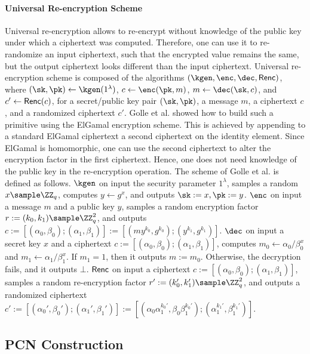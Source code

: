 \paragraph{Universal Re-encryption Scheme} Universal re-encryption allows to re-encrypt without 
knowledge of the public key under which a ciphertext was computed. Therefore, one can use it to 
re-randomize an input ciphertext, such that the encrypted value remains the same, but the output 
ciphertext looks different than the input ciphertext. Universal re-encryption scheme is composed 
of the algorithms $(\kgen, \enc, \dec, \renc)$, where $(\sk, \pk) \gets \kgen(1^\lambda)$, 
$c \gets \enc(\pk, m)$, $m \gets \dec(\sk, c)$, and $c' \gets \mathsf{Renc}(c)$, for a secret/public key 
pair $(\sk, \pk)$, a message $m$, a ciphertext $c$, and a randomized ciphertext $c'$. 
Golle et al. \cite{gjjs} showed how to build such a primitive using the ElGamal encryption 
scheme. This is achieved by appending to a standard ElGamal ciphertext a second ciphertext on 
the identity element. Since ElGamal is homomorphic, one can use the second ciphertext to alter 
the encryption factor in the first ciphertext. Hence, one does not need knowledge of the public 
key in the re-encryption operation. The scheme of Golle et al. is defined as follows. $\kgen$ on 
input the security parameter $1^\lambda$, samples a random $x \sample \ZZ_q$, computes $y \gets 
g^x$, and outputs $\sk := x, \pk := y$. $\enc$ on input a message $m$ and a public key $y$, 
samples a random encryption factor $r := (k_0, k_1) \sample \ZZ_q^2$, and outputs 
$c := [(\alpha_0,\beta_0);(\alpha_1,\beta_1)] := [(my^{k_0},g^{k_0});(y^{k_1},g^{k_1})]$. $\dec$ 
on input a secret key $x$ and a ciphertext $c := [(\alpha_0,\beta_0);(\alpha_1,\beta_1)]$, 
computes $m_0 \gets \alpha_0 / \beta_0^x$ and $m_1 \gets \alpha_1 / \beta_1^x$. If $m_1 = 1$, 
then it outputs $m := m_0$. Otherwise, the decryption fails, and it outputs $\bot$. $\mathsf{Renc}$ on 
input a ciphertext $c := [(\alpha_0,\beta_0); (\alpha_1,\beta_1)]$, samples a random 
re-encryption factor $r' := (k_0',k_1') \sample \ZZ_q^2$, and outputs a randomized ciphertext 
$c' := [(\alpha_0',\beta_0');(\alpha_1',\beta_1')] := [(\alpha_0\alpha_1^{k_0'},
\beta_0\beta_1^{k_0'});(\alpha_1^{k_1'},\beta_1^{k_1'})]$.

\subsection{PCN Construction}

